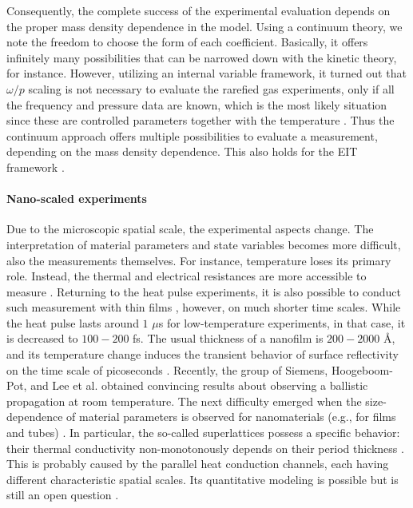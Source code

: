\documentclass[sn-mathphys]{sn-jnl}%
\theoremstyle{thmstyleone}%
\theoremstyle{thmstyletwo}%
\theoremstyle{thmstylethree}%
\begin{document}
{Consequently, the complete success of the experimental evaluation depends on the proper mass density dependence in the model. Using a continuum theory, we note the freedom to choose the form of each coefficient. Basically, it offers infinitely many possibilities that can be narrowed down with the kinetic theory, for instance. However, utilizing an internal variable framework, it turned out that $\omega/p$ scaling is not necessary to evaluate the rarefied gas experiments, only if all the frequency and pressure data are known, which is the most likely situation since these are controlled parameters together with the temperature \cite{Kov18rg}. Thus the continuum approach offers multiple possibilities to evaluate a measurement, depending on the mass density dependence. This also holds for the EIT framework \cite{CarMorr72a, CarMorr72b, KovJouRog19}.

\paragraph{Nano-scaled experiments}
Due to the microscopic spatial scale, the experimental aspects change. The interpretation of material parameters and state variables becomes more difficult, also the measurements themselves. For instance, temperature loses its primary role. Instead, the thermal and electrical resistances are more accessible to measure \cite{ChanEtal08}. Returning to the heat pulse experiments, it is also possible to conduct such measurement with thin films \cite{CepEtal15}, however, on much shorter time scales. While the heat pulse lasts around $1$ $\mu$s for low-temperature experiments, in that case, it is decreased to $100-200$ fs. The usual thickness of a nanofilm is $200-2000$ \r{A}, and its temperature change induces the transient behavior of surface reflectivity on the time scale of picoseconds \cite{Broetal87}. Recently, the group of Siemens, Hoogeboom-Pot, and Lee et al. \cite{SiemEtal10, HoogEtal15, LeeEtal15} obtained convincing results about observing a ballistic propagation at room temperature. The next difficulty emerged when the size-dependence of material parameters is observed for nanomaterials (e.g., for films and tubes) \cite{Wang11nonFou, Klemens01, CahillEtal02, CahEtal03, KimEtal07, RawEtal09, AlvJou07KN, ChoiEtal06, YangZhangLi10, ChenEtal08, FujiEtal05, Cauguo07}. In particular, the so-called superlattices possess a specific behavior: their thermal conductivity non-monotonously depends on their period thickness \cite{SahaEtal11, SahaEtal16, VazVanKov20}. This is probably caused by the parallel heat conduction channels, each having different characteristic spatial scales. Its quantitative modeling is possible but is still an open question \cite{VazVanKov20, LebEta11a, LebEtal11}.

}
\end{document}
